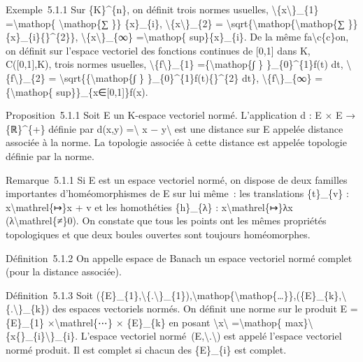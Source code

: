 \documentclass[]{article}
\begin{document}
Exemple~5.1.1 Sur \{K\}\^{}\{n\}, on définit trois normes usuelles,
\textbackslash{}\textbar{}\{x\textbackslash{}\textbar{}\}\_\{1\}
=\textbackslash{}mathop\{ \textbackslash{}mathop\{∑ \}\}
\textbar{}\{x\}\_\{i\}\textbar{},
\textbackslash{}\textbar{}\{x\textbackslash{}\textbar{}\}\_\{2\} =
\textbackslash{}sqrt\{\textbackslash{}mathop\{\textbackslash{}mathop\{∑
\}\} \textbar{}\{x\}\_\{i\}\{\textbar{}\}\^{}\{2\}\},
\textbackslash{}\textbar{}\{x\textbackslash{}\textbar{}\}\_\{∞\}
=\textbackslash{}mathop\{ sup\}\textbar{}\{x\}\_\{i\}\textbar{}. De la
même fa\textbackslash{}c\{c\}on, on définit sur l'espace vectoriel des
fonctions continues de {[}0,1{]} dans K, C({[}0,1{]},K), trois normes
usuelles,
\textbackslash{}\textbar{}\{f\textbackslash{}\textbar{}\}\_\{1\}
=\{\textbackslash{}mathop\{∫ \}
\}\_\{0\}\^{}\{1\}\textbar{}f(t)\textbar{} dt,
\textbackslash{}\textbar{}\{f\textbackslash{}\textbar{}\}\_\{2\} =
\textbackslash{}sqrt\{\{\textbackslash{}mathop\{∫ \}
\}\_\{0\}\^{}\{1\}\textbar{}f(t)\{\textbar{}\}\^{}\{2\} dt\},
\textbackslash{}\textbar{}\{f\textbackslash{}\textbar{}\}\_\{∞\}
=\{\textbackslash{}mathop\{
sup\}\}\_\{x∈{[}0,1{]}\}\textbar{}f(x)\textbar{}.

Proposition~5.1.1 Soit E un K-espace vectoriel normé. L'application d :
E × E → \{ℝ\}\^{}\{+\} définie par d(x,y) =\textbackslash{}\textbar{} x
− y\textbackslash{}\textbar{} est une distance sur E appelée distance
associée à la norme. La topologie associée à cette distance est appelée
topologie définie par la norme.

Remarque~5.1.1 Si E est un espace vectoriel normé, on dispose de deux
familles importantes d'homéomorphismes de E sur lui même~: les
translations \{t\}\_\{v\} : x\textbackslash{}mathrel\{↦\}x + v et les
homothéties \{h\}\_\{λ\} : x\textbackslash{}mathrel\{↦\}λx
(λ\textbackslash{}mathrel\{≠\}0). On constate que tous les points ont
les mêmes propriétés topologiques et que deux boules ouvertes sont
toujours homéomorphes.

Définition~5.1.2 On appelle espace de Banach un espace vectoriel normé
complet (pour la distance associée).

Définition~5.1.3 Soit
(\{E\}\_\{1\},\textbackslash{}\textbar{}\{.\textbackslash{}\textbar{}\}\_\{1\}),\textbackslash{}mathop\{\textbackslash{}mathop\{\ldots{}\}\},(\{E\}\_\{k\},\textbackslash{}\textbar{}\{.\textbackslash{}\textbar{}\}\_\{k\})
des espaces vectoriels normés. On définit une norme sur le produit E =
\{E\}\_\{1\} ×\textbackslash{}mathrel\{⋯\} × \{E\}\_\{k\} en posant
\textbackslash{}\textbar{}x\textbackslash{}\textbar{}
=\textbackslash{}mathop\{
max\}\textbackslash{}\textbar{}\{x\{\}\_\{i\}\textbackslash{}\textbar{}\}\_\{i\}.
L'espace vectoriel
normé~(E,\textbackslash{}\textbar{}.\textbackslash{}\textbar{}) est
appelé l'espace vectoriel normé produit. Il est complet si chacun des
\{E\}\_\{i\} est complet.
\end{document}
